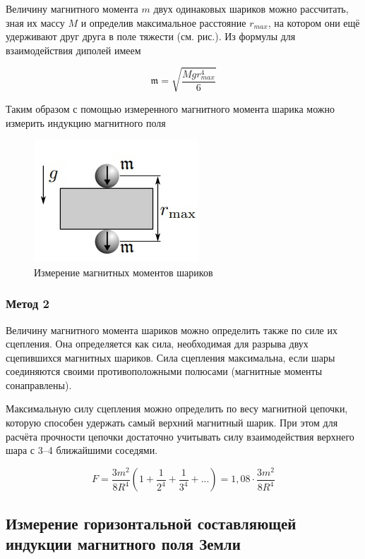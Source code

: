 \documentclass[a4paper, 12pt]{article}%
\begin{document}
Величину магнитного момента $m$ двух одинаковых шариков можно рассчитать, зная их массу $M$ и определив максимальное расстояние $r_{max}$, на котором они ещё удерживают друг друга в поле тяжести (см. рис.). Из формулы для взаимодействия диполей имеем

\begin{equation}
    \mathfrak{m} = \sqrt{\frac{Mgr^4_{max}}{6}}
\end{equation}

Таким образом с помощью измеренного магнитного момента шарика можно измерить индукцию магнитного поля

\begin{figure}[h]
    \centering
    \includegraphics[width = 5 cm]{1.jpg}
    \caption{Измерение магнитных моментов шариков}
    \label{msh1}
\end{figure}

\subsubsection{Метод 2}

Величину магнитного момента шариков можно определить также по силе их сцепления. Она определяется как сила, необходимая для разрыва двух сцепившихся магнитных шариков. Сила сцепления максимальна, если шары соединяются своими противоположными полюсами (магнитные моменты сонаправлены).

Максимальную силу сцепления можно определить по весу магнитной цепочки, которую способен удержать самый верхний магнитный шарик. При этом для расчёта прочности цепочки достаточно учитывать силу взаимодействия верхнего шара с 3–4 ближайшими соседями.

\begin{equation}
    F = \frac{3m^2}{8R^4} \left( 1 + \frac{1}{2^4} + \frac{1}{3^4} + ...\right) = 1,08 \cdot \frac{3m^2}{8R^4}
\end{equation}

\subsection{Измерение горизонтальной составляющей индукции магнитного поля Земли}
\end{document}
